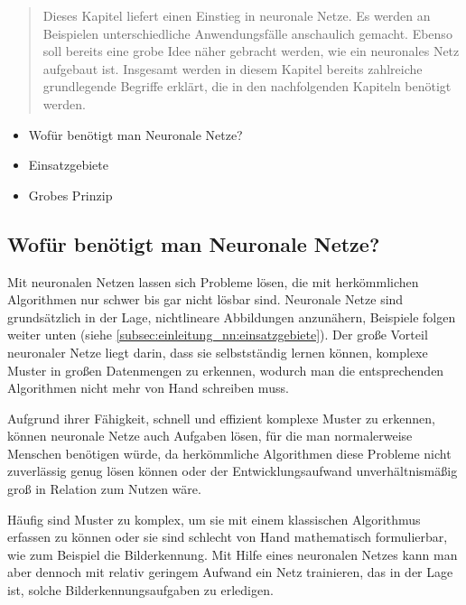 \begin{tcolorbox}[title={Inhalt}]
  \begin{quotation}\noindent
      Dieses Kapitel liefert einen Einstieg in neuronale Netze. Es werden an Beispielen unterschiedliche Anwendungsfälle anschaulich gemacht.
      Ebenso soll bereits eine grobe Idee näher gebracht werden, wie ein neuronales Netz aufgebaut ist.
      Insgesamt werden in diesem Kapitel bereits zahlreiche grundlegende Begriffe erklärt, die in den nachfolgenden Kapiteln benötigt werden.
  \end{quotation}
  \begin{itemize}  
    \item Wofür benötigt man Neuronale Netze?
    \item Einsatzgebiete
    \item Grobes Prinzip
  \end{itemize}
\end{tcolorbox}

\subsection{Wofür benötigt man Neuronale Netze?}\label{subsec:einleitung_nn:wofuer_nn}
Mit neuronalen Netzen lassen sich Probleme lösen, die mit herkömmlichen Algorithmen nur schwer bis gar nicht lösbar sind. Neuronale Netze sind grundsätzlich in der Lage, nichtlineare Abbildungen anzunähern, Beispiele folgen weiter unten (siehe \ref*{subsec:einleitung_nn:einsatzgebiete}).
Der große Vorteil neuronaler Netze liegt darin, dass sie selbstständig lernen können, komplexe Muster in großen Datenmengen zu erkennen, wodurch man die entsprechenden Algorithmen nicht mehr von Hand schreiben muss.

\bigbreak\noindent
Aufgrund ihrer Fähigkeit, schnell und effizient komplexe Muster zu erkennen, können neuronale Netze auch Aufgaben lösen, für die man normalerweise Menschen benötigen würde, da herkömmliche Algorithmen diese Probleme nicht zuverlässig genug lösen können oder der Entwicklungsaufwand unverhältnismäßig groß in Relation zum Nutzen wäre.

\bigbreak\noindent
Häufig sind Muster zu komplex, um sie mit einem klassischen Algorithmus erfassen zu können oder sie sind schlecht von Hand mathematisch formulierbar, wie zum Beispiel die Bilderkennung.
Mit Hilfe eines neuronalen Netzes kann man aber dennoch mit relativ geringem Aufwand ein Netz trainieren, das in der Lage ist, solche Bilderkennungsaufgaben zu erledigen.

